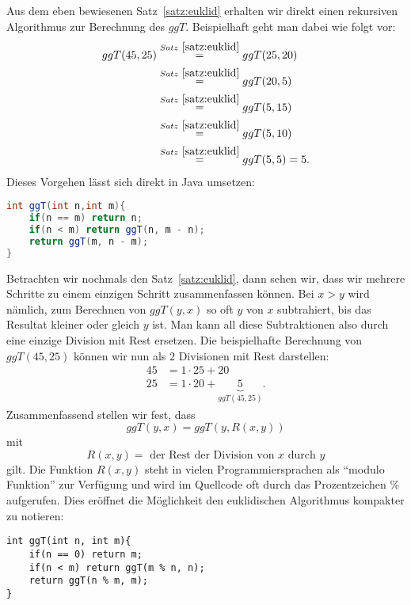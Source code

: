 \begin{rk}
Aus dem eben bewiesenen Satz~\ref{satz:euklid} erhalten wir direkt einen rekursiven Algorithmus zur Berechnung des $ggT$. Beispielhaft geht man dabei wie folgt vor:
\begin{align*}
ggT(45,25)&\stackrel{Satz~\ref{satz:euklid}}{=}ggT(25,20)\\
&\stackrel{Satz~\ref{satz:euklid}}{=}ggT(20,5)\\
&\stackrel{Satz~\ref{satz:euklid}}{=}ggT(5,15)\\
&\stackrel{Satz~\ref{satz:euklid}}{=}ggT(5,10)\\
&\stackrel{Satz~\ref{satz:euklid}}{=}ggT(5,5)=5.
\end{align*}
Dieses Vorgehen lässt sich direkt in Java umsetzen:
\begin{framed}
\begin{lstlisting}[language=Java]
int ggT(int n,int m){
    if(n == m) return n;
    if(n < m) return ggT(n, m - n);
    return ggT(m, n - m);
}
\end{lstlisting}
\end{framed}
Betrachten wir nochmals den Satz~\ref{satz:euklid}, dann sehen wir, dass wir mehrere Schritte zu einem einzigen Schritt zusammenfassen können. Bei $x>y$ wird nämlich, zum Berechnen von $ggT(y,x)$ so oft $y$ von $x$ subtrahiert, bis das Resultat kleiner oder gleich $y$ ist. Man kann all diese Subtraktionen also durch eine einzige Division mit Rest ersetzen.
Die beispielhafte Berechnung von $ggT(45,25)$ können wir nun als $2$ Divisionen mit Rest darstellen:
\begin{align*}
45 &= 1 \cdot 25 + 20\\
25 &= 1 \cdot 20 + \underbrace{5}_{ggT(45,25)}.
\end{align*}
Zusammenfassend stellen wir fest, dass
\[
ggT(y,x)=ggT(y,R(x,y))
\]
mit
\[
R(x,y)=\text{ der Rest der Division von }x\text{ durch }y
\]
gilt. Die Funktion $R(x,y)$ steht in vielen Programmiersprachen als ``modulo Funktion'' zur Verfügung und wird im Quellcode oft durch das Prozentzeichen $\%$ aufgerufen. Dies eröffnet die Möglichkeit den euklidischen Algorithmus kompakter zu notieren:\\

\lstset{language=Java}
\begin{framed}
\begin{lstlisting}
int ggT(int n, int m){
    if(n == 0) return m;
    if(n < m) return ggT(m % n, n);
    return ggT(n % m, m);
}
\end{lstlisting}
\end{framed}
\end{rk}

